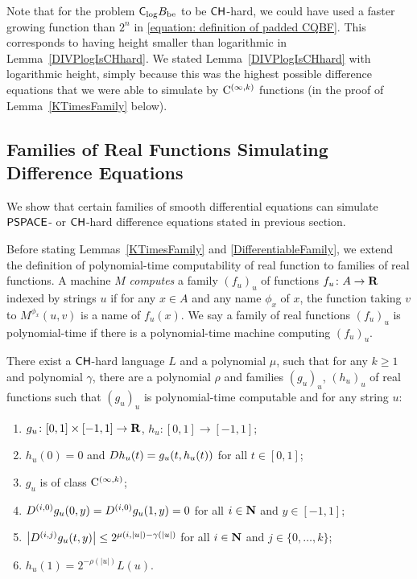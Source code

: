 Note that for the problem $\mathsf{C}_{\log} B_{\mathrm{be}}$ to be 
$\mathsf{CH}$-hard, 
we could have used a faster growing function than $2 ^n$ in
\eqref{equation: definition of padded CQBF}. 
This corresponds to having height smaller than logarithmic in 
Lemma~\ref{DIVPlogIsCHhard}. 
We stated Lemma~\ref{DIVPlogIsCHhard} with logarithmic height, 
simply because this was the highest possible difference equations
that we were able to simulate by $\mathrm C ^{(\infty, k)}$ functions
(in the proof of Lemma~\ref{KTimesFamily} below). 

\subsection{Families of Real Functions Simulating Difference Equations}
\label{subsection: ode family}
We show that certain families of smooth differential equations can simulate 
$\mathsf{PSPACE}$- or $\mathsf{CH}$-hard difference equations stated in previous section.

Before stating Lemmas~\ref{KTimesFamily} and \ref{DifferentiableFamily},
we extend the definition of polynomial-time computability of real function
to families of real functions.
A machine $M$ \emph{computes} a family $(f_u)_u$ of functions $f _u \colon A \to \mathbf R$ 
indexed by strings $u$
if for any $x \in A$ and any name $\phi_x$ of $x$,
the function taking $v$ to $M ^{\phi _x} (u, v)$ is a name of $f _u (x)$.
We say a family of real functions $(f_u)_u$ is polynomial-time if there is
a polynomial-time machine computing $(f_u)_u$.

 \begin{lemma}
  \label{KTimesFamily}
  There exist a $\mathsf{CH}$-hard language $L$ and a polynomial $\mu$,
  such that for any $k \ge 1$ and polynomial $\gamma$,
  there are a polynomial $\rho$ and families $(g_u)_u$, $(h_u)_u$ of real functions
  such that $(g_u)_u$ is polynomial-time computable and for any string $u$:
  \begin{enumerate}
   \item \label{enum:kf:start}
	 $g_u\colon [0,1] \times [-1,1]\to \mathbf R$, $h_u\colon [0,1] \to [-1,1]$;
   \item \label{enum:equation}
	 $h_u(0) = 0$ and $D h_u(t) = g_u(t, h_u(t))$ for all $t \in [0,1]$;
   \item \label{enum:differentiability}
         $g_u$ is of class $\mathrm C^{(\infty, k)}$;
   \item \label{enum:boundary}
	 $
	 D^{(i, 0)} g_u(0,y) = D^{(i, 0)} g_u(1,y) = 0
         $ for all $i \in \mathbf N$ and $y \in [-1,1]$;
   \item \label{enum:smooth}
	 $
	 \left|D^{(i,j)} g_u(t,y)\right| \le 2^{\mu(i, |u|) - \gamma(|u|)}
         $ for all $i \in \mathbf N$ and $j \in \{0, \dots, k\}$;
   \item \label{enum:kf:end}
	 $h_u(1) = 2^{-\rho(|u|)} L(u)$.
  \end{enumerate}
 \end{lemma}

